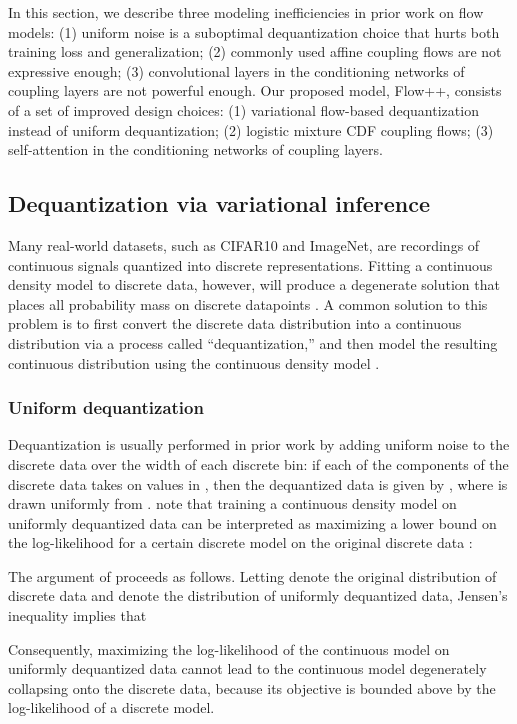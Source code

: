 \documentclass{article}
\begin{document}
In this section, we describe three modeling inefficiencies in prior work on flow models: (1) uniform noise is a suboptimal dequantization choice that hurts both training loss and generalization; (2) commonly used affine coupling flows are not expressive enough; (3) convolutional layers in the conditioning networks of coupling layers are not powerful enough.
Our proposed model, Flow++, consists of a set of improved design choices:
(1) variational flow-based dequantization instead of uniform dequantization; (2) logistic mixture CDF coupling flows; (3) self-attention in the conditioning networks of coupling layers. 

\subsection{Dequantization via variational inference}
Many real-world datasets, such as CIFAR10 and ImageNet, are recordings of continuous signals quantized into discrete representations. Fitting a continuous density model to discrete data, however, will produce a degenerate solution that places all probability mass on discrete datapoints \citep{uria2013rnade}. A common solution to this problem is to first convert the discrete data distribution into a continuous distribution via a process called ``dequantization,'' and then model the resulting continuous distribution using the continuous density model \citep{uria2013rnade,dinh2016density,salimans2017pixelcnn++}.

\subsubsection{Uniform dequantization}
Dequantization is usually performed in prior work by adding uniform noise to the discrete data over the width of each discrete bin: if each of the  components of the discrete data  takes on values in , then the dequantized data is given by , where  is drawn uniformly from . \citet{theis2015note} note that training a continuous density model  on uniformly dequantized data  can be interpreted as maximizing a lower bound on the log-likelihood for a certain discrete model  on the original discrete data :

The argument of \citet{theis2015note} proceeds as follows. Letting  denote the original distribution of discrete data and  denote the distribution of uniformly dequantized data, Jensen's inequality implies that

Consequently, maximizing the log-likelihood of the continuous model on uniformly dequantized data cannot lead to the continuous model degenerately collapsing onto the discrete data, because its objective is bounded above by the log-likelihood of a discrete model.
\end{document}
